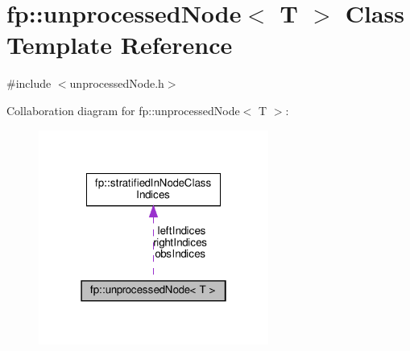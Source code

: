 \hypertarget{classfp_1_1unprocessedNode}{}\section{fp\+:\+:unprocessed\+Node$<$ T $>$ Class Template Reference}
\label{classfp_1_1unprocessedNode}


{\ttfamily \#include $<$unprocessed\+Node.\+h$>$}



Collaboration diagram for fp\+:\+:unprocessed\+Node$<$ T $>$\+:\nopagebreak
\begin{figure}[H]
\begin{center}
\leavevmode
\includegraphics[width=214pt]{classfp_1_1unprocessedNode__coll__graph}
\end{center}
\end{figure}

